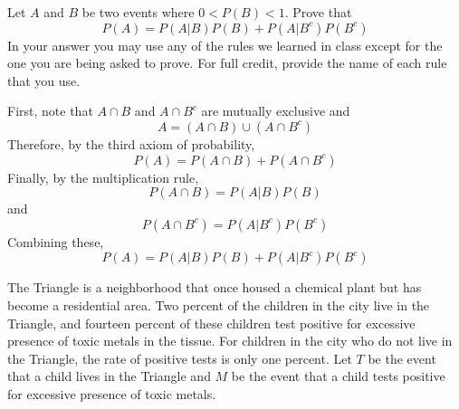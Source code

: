 \documentclass[addpoints,12pt]{exam}
\begin{document}
\begin{questions}

\question[10] Let $A$ and $B$ be two events where $0<P(B)<1$. Prove that $$P(A) = P(A|B)P(B) + P(A|B^c)P(B^c)$$
In your answer you may use any of the rules we learned in class except for the one you are being asked to prove. For full credit, provide the name of each rule that you use. 
	\begin{solution}[2.5in]
		First, note that $A\cap B$ and $A \cap B^c$ are mutually exclusive and 
			$$A = (A\cap B) \cup (A \cap B^c)$$
	Therefore, by the third axiom of probability,
			$$P(A) = P(A\cap B) + P(A \cap B^c)$$
	Finally, by the multiplication rule,
		$$P(A\cap B) = P(A|B)P(B)$$
	and 
		$$P(A \cap B^c) = P(A|B^c)P(B^c)$$
		Combining these,
		$$P(A) = P(A|B)P(B) + P(A|B^c)P(B^c)$$
	\end{solution}

\question The Triangle is a neighborhood that once housed a chemical plant but has become a residential area. Two percent of the children in the city live in the Triangle, and fourteen percent of these children test positive for excessive presence of toxic metals in the tissue. For children in the city who do not live in the Triangle, the rate of positive tests is only one percent. Let $T$ be the event that a child lives in the Triangle and $M$ be the event that a child tests positive for excessive presence of toxic metals.
\end{questions}
\end{document}
